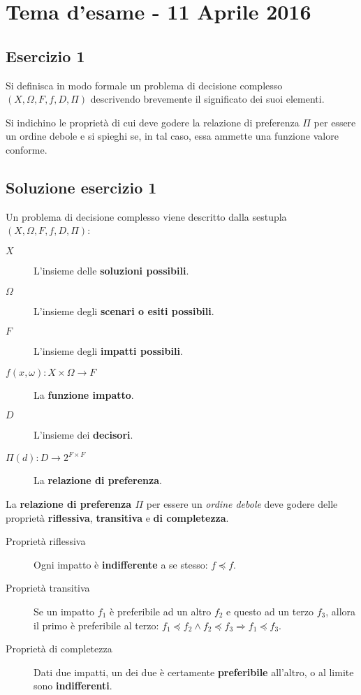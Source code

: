 \documentclass[\main/main.tex]{subfiles}
\begin{document}
\section{Tema d'esame - 11 Aprile 2016}

\subsection{Esercizio 1}
Si definisca in modo formale un problema di decisione complesso $(X, \Omega, F, f, D, \Pi)$ descrivendo brevemente il significato dei suoi elementi.

Si indichino le proprietà di cui deve godere la relazione di preferenza $\Pi$ per essere un ordine debole e si spieghi se, in tal caso, essa ammette una funzione valore conforme.

\subsection{Soluzione esercizio 1}
Un problema di decisione complesso viene descritto dalla sestupla $(X, \Omega, F, f, D, \Pi)$:

\begin{description}
	\item [$X$] L'insieme delle \textbf{soluzioni possibili}.
	\item [$\Omega$] L'insieme degli \textbf{scenari o esiti possibili}.
	\item [$F$] L'insieme degli \textbf{impatti possibili}.
	\item [$f(x, \omega): X \times \Omega  \rightarrow F$] La \textbf{funzione impatto}.
	\item [$D$] L'insieme dei \textbf{decisori}.
	\item [$\Pi(d): D \rightarrow 2^{F\times F}$] La \textbf{relazione di preferenza}.
\end{description}

\vspace{5mm}

La \textbf{relazione di preferenza $\Pi$} per essere un \textit{ordine debole} deve godere delle proprietà \textbf{riflessiva}, \textbf{transitiva} e \textbf{di completezza}.

\begin{description}
	\item [Proprietà riflessiva] Ogni impatto è \textbf{indifferente} a se stesso: $f \preceq f$.
	\item [Proprietà transitiva] Se un impatto $f_1$ è preferibile ad un altro $f_2$ e questo ad un terzo $f_3$, allora il primo è preferibile al terzo: $f_1 \preceq f_2 \land f_2 \preceq f_3 \Rightarrow f_1 \preceq f_3$.
	\item [Proprietà di completezza] Dati due impatti, un dei due è certamente \textbf{preferibile} all'altro, o al limite sono \textbf{indifferenti}.
\end{description}
\end{document}
